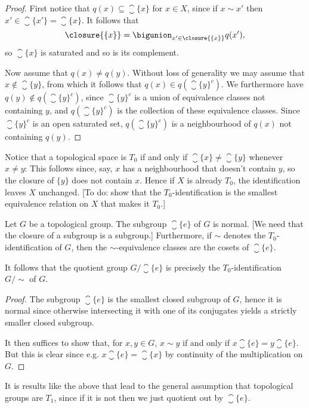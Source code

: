 \documentclass[article, a4paper, 11pt, oneside]{memoir}
\numberwithin{equation}{chapter}
\begin{document}
\begin{proof}
    First notice that $q(x) \subseteq \closure{\{x\}}$ for $x \in X$, since if $x \sim x'$ then $x' \in \closure{\{x'\}} = \closure{\{x\}}$. It follows that
    \begin{equation*}
        \closure{\{x\}}
            = \bigunion_{x' \in \closure{\{x\}}} q(x'),
    \end{equation*}
    so $\closure{\{x\}}$ is saturated and so is its complement.

    Now assume that $q(x) \neq q(y)$. Without loss of generality we may assume that $x \not\in \closure{\{y\}}$, from which it follows that $q(x) \in q(\closure{\{y\}}^c)$. We furthermore have $q(y) \not\in q(\closure{\{y\}}^c)$, since $\closure{\{y\}}^c$ is a union of equivalence classes not containing $y$, and $q(\closure{\{y\}}^c)$ is the collection of these equivalence classes. Since $\closure{\{y\}}^c$ is an open saturated set, $q(\closure{\{y\}}^c)$ is a neighbourhood of $q(x)$ not containing $q(y)$.
\end{proof}

Notice that a topological space is $T_0$ if and only if $\closure{\{x\}} \neq \closure{\{y\}}$ whenever $x \neq y$: This follows since, say, $x$ has a neighbourhood that doesn't contain $y$, so the closure of $\{y\}$ does not contain $x$. Hence if $X$ is already $T_0$, the identification leaves $X$ unchanged. [To do: show that the $T_0$-identification is the smallest equivalence relation on $X$ that makes it $T_0$.]

\begin{proposition}
    Let $G$ be a topological group. The subgroup $\closure{\{e\}}$ of $G$ is normal. [We need that the closure of a subgroup is a subgroup.] Furthermore, if $\sim$ denotes the $T_0$-identification of $G$, then the $\sim$-equivalence classes are the cosets of $\closure{\{e\}}$.

    It follows that the quotient group $G / \closure{\{e\}}$ is precisely the $T_0$-identification $G/{\sim}$ of $G$.
\end{proposition}

\begin{proof}
    The subgroup $\closure{\{e\}}$ is the smallest closed subgroup of $G$, hence it is normal since otherwise intersecting it with one of its conjugates yields a strictly smaller closed subgroup.

    It then suffices to show that, for $x,y \in G$, $x \sim y$ if and only if $x \closure{\{e\}} = y \closure{\{e\}}$. But this is clear since e.g. $x \closure{\{e\}} = \closure{\{x\}}$ by continuity of the multiplication on $G$.
\end{proof}

It is results like the above that lead to the general assumption that topological groups are $T_1$, since if it is not then we just quotient out by $\closure{\{e\}}$.


\nocite{*}

\printbibliography
\end{document}
